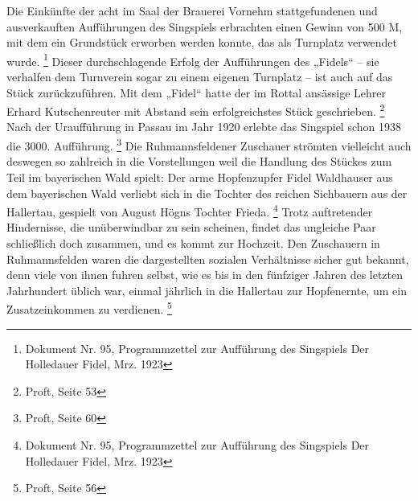 Die Einkünfte der acht im Saal der Brauerei Vornehm stattgefundenen und
ausverkauften Aufführungen des Singspiels erbrachten einen Gewinn von
500 M, mit dem ein Grundstück erworben werden konnte, das als Turnplatz
verwendet wurde. \footnote{Dokument Nr. 95, Programmzettel zur
Aufführung des Singspiels {\textquotedbl}Der Holledauer
Fidel{\textquotedbl}, Mrz. 1923} Dieser durchschlagende Erfolg der
Aufführungen des „Fidels“ – sie verhalfen dem Turnverein sogar zu einem
eigenen Turnplatz – ist auch auf das Stück zurückzuführen. Mit dem
„Fidel“ hatte der im Rottal ansässige Lehrer Erhard Kutschenreuter mit
Abstand sein erfolgreichstes Stück geschrieben. \footnote{Proft, Seite
53} Nach der Uraufführung in Passau im Jahr 1920 erlebte das Singspiel
schon 1938 die 3000. Aufführung. \footnote{Proft, Seite 60} Die
Ruhmannsfeldener Zuschauer strömten vielleicht auch deswegen so
zahlreich in die Vorstellungen weil die Handlung des Stückes zum Teil
im bayerischen Wald spielt: Der arme Hopfenzupfer Fidel Waldhauser aus
dem bayerischen Wald verliebt sich in die Tochter des reichen
Sichbauern aus der Hallertau, gespielt von August Högns Tochter
Frieda. \footnote{Dokument Nr. 95, Programmzettel zur Aufführung des
Singspiels {\textquotedbl}Der Holledauer Fidel{\textquotedbl}, Mrz.
1923} Trotz auftretender Hindernisse, die unüberwindbar zu sein
scheinen, findet das ungleiche Paar schließlich doch zusammen, und es
kommt zur Hochzeit. Den Zuschauern in Ruhmannsfelden waren die
dargestellten sozialen Verhältnisse sicher gut bekannt, denn viele von
ihnen fuhren selbst, wie es bis in den fünfziger Jahren des letzten
Jahrhundert üblich war, einmal jährlich in die Hallertau zur
Hopfenernte, um ein Zusatzeinkommen zu verdienen. \footnote{Proft,
Seite 56}

